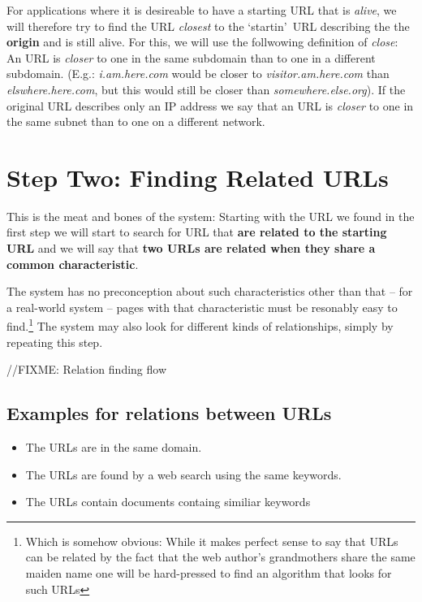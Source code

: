 \documentclass[a4paper]{danarticle}
\begin{document}
      For applications where it is desireable to have a starting
      URL that is \textit{alive}, we will therefore try to find the
      URL \textit{closest} to the \lq startin\rq\ URL describing
      the the \textbf{origin} and is still alive. For this, we 
      will use the follwowing definition of \textit{close}:
      An URL is \textit{closer} to one in the same subdomain 
      than to one in a different subdomain. (E.g.: \textit{i.am.here.com}
      would be closer to \textit{visitor.am.here.com} than
      \textit{elswhere.here.com}, but this would still be closer than
      \textit{somewhere.else.org}). If the original URL describes only
      an IP address we say that an URL is \textit{closer} to one
      in the same subnet than to one on a different network.
  \section*{Step Two: Finding Related URLs}
     This is the meat and bones of the system: Starting with the
     URL we found in the first step we will start to search for
     URL that \textbf{are related to the starting URL}
     and we will say that
     \textbf{two URLs are related when they share a common
     characteristic}. 
     
     The system has no preconception about such characteristics other
     than that -- for a real-world system -- pages with that 
     characteristic must be resonably easy to 
     find.\footnote{Which is somehow
     obvious: While it makes perfect sense to say that URLs can
     be related by the fact that the web author's grandmothers share
     the same maiden name one will be hard-pressed to find an
     algorithm that looks for such URLs} The system may also
     look for different kinds of relationships, simply by
     repeating this step.
     
     //FIXME: Relation finding flow
     
     \subsection*{Examples for relations between URLs}
       \begin{itemize}
         \item{The URLs are in the same domain.}
         \item{The URLs are found by a web search using the same keywords.}
         \item{The URLs contain documents containg similiar keywords}
       \end{itemize}
     
\end{document}
